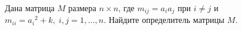 \documentclass{article}
\begin{document}
Дана матрица $M$ размера $n\times n$, где $m_{ij}=a_i a_j$ при $i\neq j$ и $m_{ii} = {a_i}^2 + k,\; i,j=1,\ldots,n$. 
Найдите определитель матрицы $M$.
\end{document}
